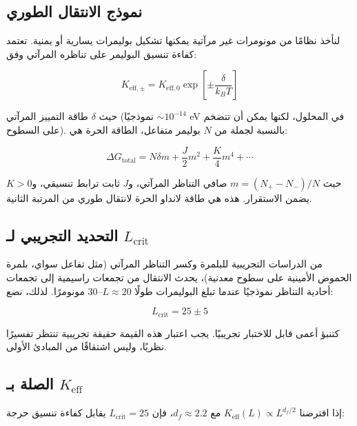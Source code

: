 \documentclass[12pt,a4paper]{article}
\theoremstyle{remark}
\newcommand{\Keff}{K_{\mathrm{eff}}}
\newcommand{\df}{d_{\!f}}
\begin{document}
	\subsection{نموذج الانتقال الطوري}
	
	لنأخذ نظامًا من مونومرات غير مرآتية يمكنها تشكيل بوليمرات يسارية أو يمنية. تعتمد كفاءة تنسيق البوليمر على تناظره المرآتي وفق:
	
	\begin{equation}
		K_{\mathrm{eff},\pm} = K_{\mathrm{eff},0} \exp\left[\pm \frac{\delta}{k_B T}\right]
		\label{eq:keff-chiral}
	\end{equation}
	
	حيث $\delta$ طاقة التمييز المرآتي (نموذجيًا $\sim 10^{-14}$ eV في المحلول، لكنها يمكن أن تتضخم على السطوح). بالنسبة لجملة من $N$ بوليمر متفاعل، الطاقة الحرة هي:
	
	\begin{equation}
		\Delta G_{\text{total}} = N \delta m + \frac{J}{2} m^2 + \frac{K}{4} m^4 + \cdots
		\label{eq:chiral-free}
	\end{equation}
	
	حيث $m = (N_+ - N_-)/N$ صافي التناظر المرآتي، و$J$ ثابت ترابط تنسيقي، و$K > 0$ يضمن الاستقرار. هذه هي طاقة لانداو الحرة لانتقال طوري من المرتبة الثانية.
	
	\subsection{التحديد التجريبي لـ $L_{\text{crit}}$}
	
	من الدراسات التجريبية للبلمرة وكسر التناظر المرآتي (مثل تفاعل سواي، بلمرة الحموض الأمينية على سطوح معدنية)، يحدث الانتقال من تجمعات راسيمية إلى تجمعات أحادية التناظر نموذجيًا عندما تبلغ البوليمرات طولًا $L \approx 20$–$30$ مونومرًا. لذلك، نضع:
	
	\begin{equation}
		\boxed{L_{\text{crit}} = 25 \pm 5}
		\label{eq:Lcrit-empirical}
	\end{equation}
	
	كتنبؤ أعمى قابل للاختبار تجريبيًا. يجب اعتبار هذه القيمة حقيقة تجريبية تنتظر تفسيرًا نظريًا، وليس اشتقاقًا من المبادئ الأولى.
	
	\subsection{الصلة بـ $\Keff$}
	
	إذا افترضنا $\Keff(L) \propto L^{\df/2}$ مع $\df \approx 2.2$، فإن $L_{\text{crit}} = 25$ يقابل كفاءة تنسيق حرجة:
	
\end{document}

